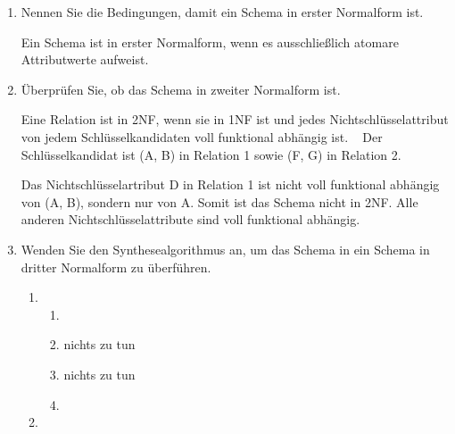\documentclass{bschlangaul-aufgabe}
\begin{document}
\begin{enumerate}


\item Nennen Sie die Bedingungen, damit ein Schema in erster Normalform
ist.

\begin{bAntwort}
Ein Schema ist in erster Normalform, wenn es ausschließlich atomare
Attributwerte aufweist.
\end{bAntwort}


\item Überprüfen Sie, ob das Schema in zweiter Normalform ist.

\begin{bAntwort}
Eine Relation ist in 2NF, wenn sie in 1NF ist und jedes
Nichtschlüsselattribut von jedem Schlüsselkandidaten voll funktional
abhängig ist.
 
Der Schlüsselkandidat ist (A, B) in Relation 1 sowie (F, G) in Relation
2.

Das Nichtschlüsselartribut D in Relation 1 ist nicht voll funktional
abhängig von (A, B), sondern nur von A. Somit ist das Schema nicht in
2NF. Alle anderen Nichtschlüsselattribute sind voll funktional abhängig.
\end{bAntwort}


\item Wenden Sie den Synthesealgorithmus an, um das Schema in ein Schema
in dritter Normalform zu überführen.

\begin{bAntwort}
\begin{enumerate}
\item {}
\begin{enumerate}
\item {}


\item {}

nichts zu tun

\item {}

nichts zu tun

\item {}


\end{enumerate}
\item {}


\end{enumerate}
\end{bAntwort}
\end{enumerate}
\end{document}
